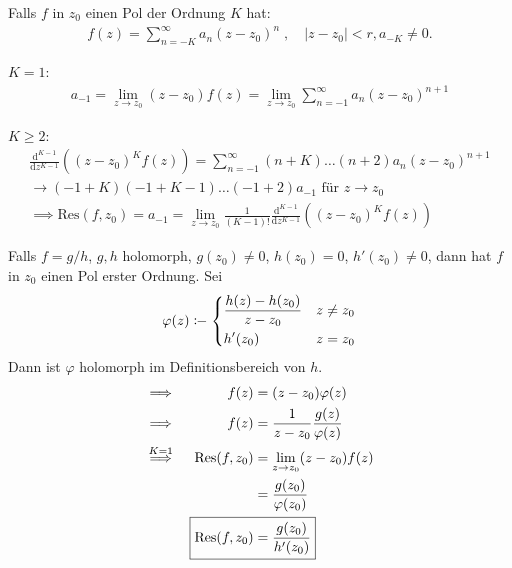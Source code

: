 \begin{theorem}[Residuenberechnung] \label{thm:4.17}
  \begin{enum-arab}
    \item Falls $f$ in $z_0$ einen Pol der Ordnung $K$ hat:
    \begin{align*}
      f(z) = \sum\limits_{n=-K}^{\infty} a_n (z-z_0)^n \; , \quad |z-z_0| < r, a_{-K} \neq 0 .
    \end{align*}
    \begin{enum-alph}
      \item $K=1$:
      \begin{align*}
        \boxed{a_{-1} = \lim\limits_{z \to z_0} (z-z_0) f(z)} = \lim\limits_{z \to z_0} \sum\limits_{n=-1}^{\infty} a_n (z-z_0)^{n+1}
      \end{align*}
      
      \item $K \geq 2$:
      \begin{gather*}
        \frac{\mathrm{d}^{K-1}}{\mathrm{d}z^{K-1}} \left( (z-z_0)^K f(z) \right)
        = \sum\limits_{n=-1}^{\infty} (n+K) \ldots (n+2) a_n (z-z_0)^{n+1} \\
        \to (-1+K)(-1+K-1)\ldots(-1+2) a_{-1} \text{ für } z \to z_0 \\
        \implies \boxed{\mathrm{Res}(f,z_0) = a_{-1} = \lim\limits_{z \to z_0} \frac{1}{(K-1)!} \frac{\mathrm{d}^{K-1}}{\mathrm{d}z^{K-1}} \left( (z-z_0)^K f(z) \right)}
      \end{gather*}
    \end{enum-alph}
    
    \item Falls $f = g/h$, $g,h$ holomorph, $g(z_0) \neq 0$, $h(z_0) = 0$, $h'(z_0) \neq 0$, dann hat $f$ in $z_0$ einen Pol erster Ordnung. Sei
    \begin{align*}
      \varphi(z) \coloneq
      \begin{dcases}
        \frac{h(z) - h(z_0)}{z - z_0} & z \neq z_0 \\
        h'(z_0) & z = z_0
      \end{dcases}
    \end{align*}
    Dann ist $\varphi$ holomorph im Definitionsbereich von $h$.
    \begin{align*}
      \implies&& f(z) &= (z-z_0) \varphi(z) \\
      \implies&& f(z) &= \frac{1}{z-z_0} \frac{g(z)}{\varphi(z)} \\
      \overset{K=1}{\implies}&& \mathrm{Res}(f,z_0) &= \lim\limits_{z \to z_0} (z-z_0) f(z) \\
      &&&= \frac{g(z_0)}{\varphi(z_0)} \\
      && \Aboxed{\mathrm{Res}(f,z_0) &= \frac{g(z_0)}{h'(z_0)}}
    \end{align*}
  \end{enum-arab}
\end{theorem}


